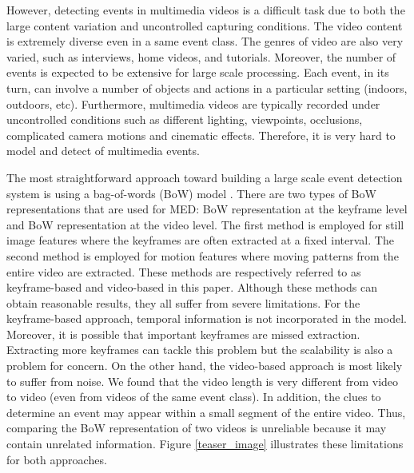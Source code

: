 However, detecting events in multimedia videos is a difficult task due to both the large content variation and uncontrolled capturing conditions. The video content is extremely diverse even in a same event class. The genres of video are also very varied, such as interviews, home videos, and tutorials. Moreover, the number of events is expected to be extensive for large scale processing. Each event, in its turn, can involve a number of objects and actions in a particular setting (indoors, outdoors, etc). Furthermore, multimedia videos are typically recorded under uncontrolled conditions such as different lighting, viewpoints, occlusions, complicated camera motions and cinematic effects. Therefore, it is very hard to model and detect of multimedia events.

The most straightforward approach toward building a large scale event detection system is using a bag-of-words (BoW) model \cite{Csurka04visualcategorization}. There are two types of BoW representations that are used for MED: BoW representation at the keyframe level and BoW representation at the video level. The first method is employed for still image features where the keyframes are often extracted at a fixed interval. The second method is employed for motion features where moving patterns from the entire video are extracted. These methods are respectively referred to as keyframe-based \cite{trecvid10:IBM,trecvid10:cuucf,DBLP:conf/trecvid/MatsuoN10} and video-based \cite{trecvid10:IBM,trecvid10:cuucf} in this paper. Although these methods can obtain reasonable results, they all suffer from severe limitations. For the keyframe-based approach, temporal information is not incorporated in the model. Moreover, it is possible that important keyframes are missed extraction. Extracting more keyframes can tackle this problem but the scalability is also a problem for concern. On the other hand, the video-based approach is most likely to suffer from noise. We found that the video length is very different from video to video (even from videos of the same event class). In addition, the clues to determine an event may appear within a small segment of the entire video. Thus, comparing the BoW representation of two videos is unreliable because it may contain unrelated information. Figure \ref{teaser_image} illustrates these limitations for both approaches. 


